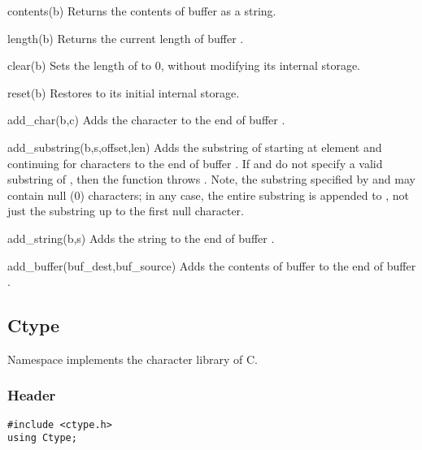 \begin{defun}{contents}{(b)}
Returns the contents of buffer  as a string.
\end{defun}

\begin{defun}{length}{(b)}
Returns the current length of buffer .
\end{defun}

\begin{defun}{clear}{(b)}
Sets the length of  to 0, without modifying its internal storage.
\end{defun}

\begin{defun}{reset}{(b)}
Restores  to its initial internal storage.
\end{defun}

\begin{defun}{add_char}{(b,c)}
Adds the character  to the end of buffer .
\end{defun}

\begin{defun}{add_substring}{(b,s,offset,len)}
Adds the substring of  starting at element  and
continuing for  characters to the end of buffer .  If
 and  do not specify a valid substring of ,
then the function throws .
Note, the substring specified by  and  may contain
null (0) characters; in any case, the entire substring is appended to
, not just the substring up to the first null character.
\end{defun}

\begin{defun}{add_string}{(b,s)}
Adds the string  to the end of buffer .
\end{defun}

\begin{defun}{add_buffer}{(buf_dest,buf_source)}
Adds the contents of buffer  to the end of buffer
.
\end{defun}

\subsection{Ctype}

Namespace  implements the character library of C\@.

\subsubsection*{Header}
\begin{verbatim}
#include <ctype.h>
using Ctype;
\end{verbatim}

